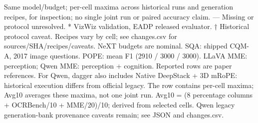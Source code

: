 \documentclass[10pt,a4paper]{article}
\begin{document}
{\footnotesize Same model/budget; per-cell maxima across historical runs and generation recipes, for inspection; no single joint run or paired accuracy claim. — Missing or protocol unresolved. * VizWiz validation, EADP released evaluator. † Historical protocol caveat. Recipes vary by cell; see changes.csv for sources/SHA/recipes/caveats. NeXT budgets are nominal. SQA: shipped CQM-A, 2017 image questions. POPE: mean F1 (2910 / 3000 / 3000). LLaVA MME: perception; Qwen MME: perception + cognition. Reported rows are paper references. For Qwen, dagger also includes Native DeepStack + 3D mRoPE: historical execution differs from official legacy. The row contains per-cell maxima; Avg10 averages these maxima, not one joint run. Avg10 = (8 percentage columns + OCRBench/10 + MME/20)/10; derived from selected cells. Qwen legacy generation-bank provenance caveats remain; see JSON and changes.csv.\par}
\end{document}
